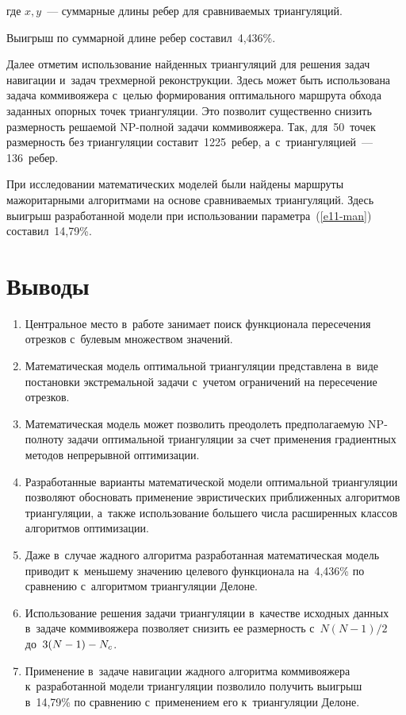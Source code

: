 \begin{multicols}{2}

\noindent
где $x, y$~--- суммарные длины ребер для срав\-ни\-ва\-емых триангуляций.

  Выигрыш по суммарной длине ребер со\-ста\-вил~4,436\%.
  
  Далее отметим использование найденных триангуляций для решения задач 
навигации и~задач трехмерной реконструкции. Здесь может быть использована 
задача коммивояжера с~целью формирования оптимального маршрута обхода 
заданных опорных точек триангуляции. Это позволит существенно снизить 
размерность ре\-ша\-емой NP-пол\-ной задачи коммивояжера. Так, для~50~точек 
раз\-мер\-ность без триангуляции со\-ста\-вит~1225~ребер, 
а~с~триангуляцией~--- 136~ребер.
  
  При исследовании математических моделей были найдены марш\-ру\-ты 
мажоритарными алгоритмами на основе сравниваемых триангуляций. Здесь 
выигрыш разработанной модели при использовании па\-ра\-мет\-ра~(\ref{e11-man}) 
со\-ста\-вил~14,79\%.
  

\vspace*{-6pt}
   
  

\section{Выводы}

\noindent
\begin{enumerate}[1.]
\item Центральное место в~работе занимает поиск функционала пересечения 
отрезков с~булевым множеством значений.
\item Математическая модель оптимальной триангуляции пред\-став\-ле\-на в~виде 
по\-ста\-нов\-ки экстремальной задачи с~учетом ограничений на пересечение 
отрезков.
\item Математическая модель может позволить преодолеть пред\-по\-ла\-га\-емую 
NP-пол\-но\-ту задачи оптимальной триангуляции за счет применения 
градиентных методов непрерывной оптимизации.
\item Разработанные варианты математической модели оптимальной 
триангуляции позволяют обосно\-вать применение эвристических приближенных 
алгоритмов триангуляции, а~так\-же использование большего чис\-ла 
расширенных классов алгоритмов оптимизации.
\item Даже в~случае жадного алгоритма разработанная математическая модель 
приводит к~меньшему значению целевого функционала на~4,436\% по 
сравнению с~алгоритмом триангуляции Делоне.
\item Использование решения задачи триангуляции в~качестве исходных 
данных в~задаче коммивояжера позволяет снизить ее размерность с~$N(N-1)/2$ 
до~$3(N\hm-1)\hm- N_c$.
  \item Применение в~задаче навигации жадного алгоритма коммивояжера 
к~разработанной модели триангуляции поз\-во\-ли\-ло получить выигрыш 
в~14,79\% по сравнению с~применением его к~триангуляции Делоне.
  \end{enumerate}
  

\end{multicols}
